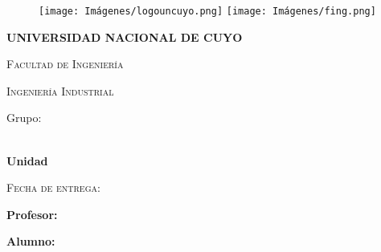 \thispagestyle{empty}
			\begin{figure}[ht]
				\texttt{[image: Imágenes/logouncuyo.png]}
				\label{escudoTecNM}
		   \endminipage
		   \minipage{\textwidth}
				\texttt{[image: Imágenes/fing.png]}
				\label{EscudoITCJ}
			\endminipage
		\end{figure}
		
		\vspace{0.1cm}
		
		\begin{center}
		    {\scshape\LARGE \textbf{ UNIVERSIDAD NACIONAL DE CUYO} \par}
			{\scshape\Large Facultad de Ingeniería \par}
			{\scshape\large Ingeniería Industrial \par}
            \vspace{0.75cm}
             {\Large \textbf{\myMateria}}

			\begin{center}
			
			
			{\Large Grupo:\myGrupo}
			\vspace{0.75cm}
				
			{\LARGE\bfseries \MyReport\\Unidad \myUnidad\par}
            \vspace{0.75cm}
            
		{\scshape\Large Fecha de entrega: \myDate\par}	
        \vspace{0.75cm}
	    \LARGE	{ \textbf{Profesor: }}\\
        \large		{ \myTeacher}
        
		\vspace{0.5cm}	
		
		\LARGE	{ \textbf{Alumno:}}
        
        \normalsize	 {\myName}

				\vspace{1.25cm}
				\vspace{0.9cm}
				
			\end{center}
	
		\end{center}
